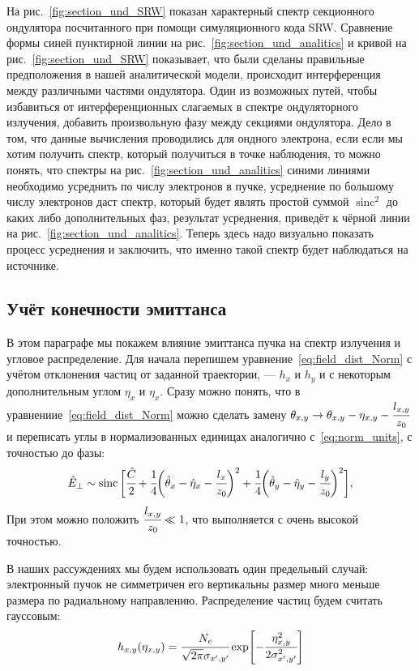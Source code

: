\documentclass[14pt,a4paper]{extarticle}
\numberwithin{equation}{section}
\DeclareMathOperator{\sinc}{sinc}
\begin{document}
На рис.~\ref{fig:section_und_SRW} показан характерный спектр секционного ондулятора посчитанного при помощи симуляционного кода SRW. Сравнение формы синей пунктирной линии на рис.~\ref{fig:section_und_analitics} и кривой на рис.~\ref{fig:section_und_SRW} показывает, что были сделаны правильные предположения в нашей аналитической модели, происходит интерференция между различными частями ондулятора.
Один из возможных путей, чтобы избавиться от интерференционных слагаемых в спектре ондуляторного излучения, добавить произвольную фазу между секциями ондулятора. Дело в том, что данные вычисления проводились для ондного электрона, если если мы хотим получить спектр, который получиться в точке наблюдения, то можно понять, что спектры на рис.~\ref{fig:section_und_analitics} синими линиями необходимо усреднить по числу электронов в пучке, усреднение по большому числу электронов даст спектр, который будет являть простой суммой $\sinc^2$ до каких либо дополнительных фаз, результат усреднения, приведёт к чёрной линии на рис.~\ref{fig:section_und_analitics}. Теперь здесь надо визуально показать процесс усреднения и заключить, что именно такой спектр будет наблюдаться на источнике.

\subsection{Учёт конечности эмиттанса}
В этом параграфе мы покажем влияние эмиттанса пучка на спектр излучения и угловое распределение. Для начала перепишем уравнение~\ref{eq:field_dist_Norm} с учётом отклонения частиц от заданной траектории, --- $h_x$ и $h_y$ и с некоторым дополнительным углом $\eta_x$ и $\eta_x$. Сразу можно понять, что в уравнениие~\ref{eq:field_dist_Norm} можно сделать замену $\theta_{x,y} \rightarrow \theta_{x,y} - \eta_{x, y} - \cfrac{l_{x,y}}{z_0}$ и переписать углы в нормализованных единицах аналогично с~\ref{eq:norm_units}, с точностью до фазы: 
\begin{equation}
	\label{eq:field_dist_Norm}
	\begin{array}{lcl}
	\hat{E}_{\bot} \sim
	\sinc\bigg[\cfrac{\hat{C}}{2} + 
	\cfrac{1}{4}\bigg(\hat{\theta}_{x} - \hat{\eta}_{x} - \cfrac{l_{x}}{z_0}\bigg)^2 +
	\cfrac{1}{4}\bigg(\hat{\theta}_{y} - \hat{\eta}_{y} - \cfrac{l_{y}}{z_0}\bigg)^2\bigg],
	\end{array}	
\end{equation}
При этом можно положить  $\cfrac{l_{x,y}}{z_0} \ll 1$, что выполняется с очень высокой точностью. 

В наших рассуждениях мы будем использовать один предельный случай: электронный пучок не симметричен его вертикальны размер много меньше размера по радиальному направлению. Распределение частиц будем считать гауссовым: 
\begin{equation}
	\label{eq:field_dist_Norm}
	h_{x, y}(\eta_{x, y}) = \cfrac{N_e}{\sqrt{2\pi}\sigma_{x', y'}} \exp[-\cfrac{\eta^2_{x, y}}{2\sigma^2_{x', y'}}]
\end{equation}
\end{document}

